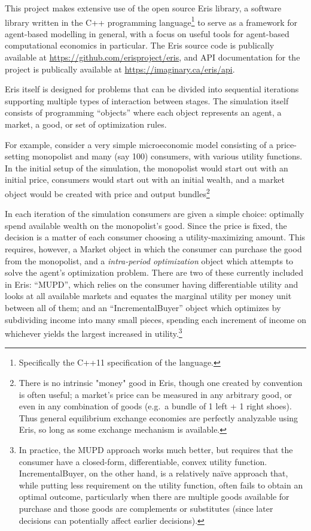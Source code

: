 \documentclass[12pt]{article}
\numberwithin{equation}{subsection}
\begin{document}
This project makes extensive use of the open source Eris library, a software library written in the
C++ programming language\footnote{Specifically the C++11 specification of the language.} to serve as
a framework for agent-based modelling in general, with a focus on useful tools for agent-based
computational economics in particular.  The Eris source code is publically available at
\url{https://github.com/erisproject/eris}, and API documentation for the project is publically
available at \url{https://imaginary.ca/eris/api}.

Eris itself is designed for problems that can be divided into sequential iterations supporting multiple
types of interaction between stages.  The simulation itself consists of programming ``objects''
where each object represents an agent, a market, a good, or set of optimization rules.

For example, consider a very simple microeconomic model consisting of a price-setting monopolist and
many (say 100) consumers, with various utility functions.  In the initial setup of the simulation,
the monopolist would start out with an initial price, consumers would start out with an initial
wealth, and a market object would be created with price and output bundles\footnote{There is no
    intrinsic "money" good in Eris, though one created by convention is often useful; a market's
    price can be measured in any arbitrary good, or even in any combination of goods (e.g.\ a bundle
    of 1 left + 1 right shoes).  Thus general equilibrium exchange economies are perfectly
analyzable using Eris, so long as some exchange mechanism is available.}

In each iteration of the simulation consumers are given a simple choice: optimally spend available
wealth on the monopolist's good.  Since the
price is fixed, the decision is a matter of each consumer choosing a utility-maximizing amount.
This requires, however, a Market object in which the consumer can purchase the good from the
monopolist, and a \emph{intra-period optimization} object which attempts to solve the agent's
optimization problem.  There are two of these currently included in Eris: ``MUPD'', which relies on
the consumer having differentiable utility and looks at all available markets and equates the
marginal utility per money unit between all of them; and an ``IncrementalBuyer'' object which
optimizes by subdividing income into many small pieces, spending each increment of income on
whichever yields the largest increased in utility.\footnote{In practice, the MUPD approach works
    much better, but requires that the consumer have a closed-form, differentiable, convex utility
    function.  IncrementalBuyer, on the other hand, is a relatively naïve approach that, while
    putting less requirement on the utility function, often fails to obtain an optimal outcome,
    particularly when there are multiple goods available for purchase and those goods are
    complements or substitutes (since later decisions can potentially affect earlier decisions).
}
\end{document}
